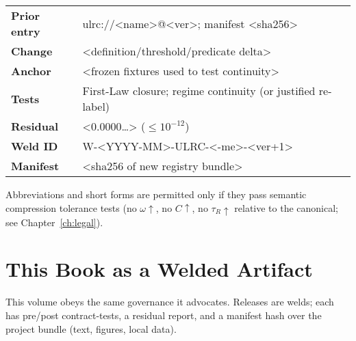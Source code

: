 \begin{eqbox}
\small
\begin{tabularx}{\linewidth}{@{}>{\bfseries}l >{\ttfamily}X@{}}
Prior entry    & ulrc://<name>@<ver>; manifest <sha256> \\
Change         & <definition/threshold/predicate delta> \\
Anchor         & <frozen fixtures used to test continuity> \\
Tests          & First-Law closure; regime continuity (or justified re-label) \\
Residual       & <0.0000…> (\(\le 10^{-12}\)) \\
Weld ID        & W-<YYYY-MM>-ULRC-<-me>-<ver+1> \\
Manifest       & <sha256 of new registry bundle> \\
\end{tabularx}
\end{eqbox}

\begin{remark}
Abbreviations and short forms are permitted only if they pass semantic compression tolerance tests (no \(\omega\uparrow\), no \(C\uparrow\), no \(\tau_R\uparrow\) relative to the canonical; see Chapter~\ref{ch:legal}).
\end{remark}

\section{This Book as a Welded Artifact}
\label{sec:book-weld}

This volume obeys the same governance it advocates. Releases are welds; each has pre/post contract-tests, a residual report, and a manifest hash over the project bundle (text, figures, local data).


